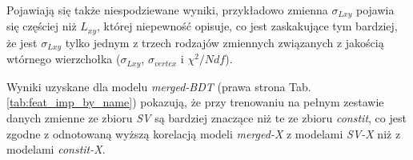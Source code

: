 Pojawiają się także niespodziewane wyniki, przykładowo zmienna $\sigma_{Lxy}$ pojawia się częściej niż $L_{xy}$, której niepewność opisuje, co jest zaskakujące tym bardziej, że jest $\sigma_{Lxy}$ tylko jednym z trzech rodzajów zmiennych związanych z jakością wtórnego wierzchołka ($\sigma_{Lxy}$, $\sigma_{vertex}$ i $\chi^2/Ndf$).

Wyniki uzyskane dla modelu \textit{merged-BDT} (prawa strona Tab. \ref{tab:feat_imp_by_name}) pokazują, że przy trenowaniu na pełnym zestawie danych zmienne ze zbioru \textit{SV} są bardziej znaczące niż te ze zbioru \textit{constit}, co jest zgodne z odnotowaną wyższą korelacją modeli \textit{merged-X} z modelami \textit{SV-X} niż z modelami \textit{constit-X}.

\newlength{\everyNthRowSpace}
\setlength{\everyNthRowSpace}{8pt}

